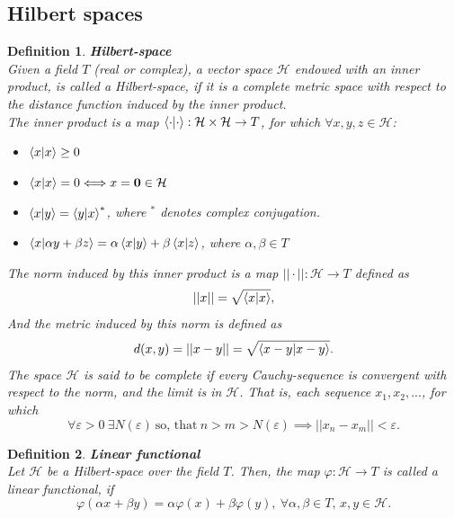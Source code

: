 \documentclass[12pt, a4paper,  nobibnotes]{article}
\newcommand{\bb}[1]{\mathbf{#1}}
\newtheorem{definition}{Definition}
\begin{document}
\subsection{Hilbert spaces}
\label{appendix:Hilbertspace}
\begin{definition}
    \textbf{Hilbert-space}\\
    Given a field $T$ (real or complex), a vector space $\mathcal H$ endowed with an inner product, is called a Hilbert-space, if
    it is a complete metric space with respect to the distance function induced by the inner product.
    \\
    The inner product is a map $\braket{\cdot|\cdot}:\mathcal{H}\times\mathcal{H} \rightarrow T$, 
    for which $\forall x,y,z \in \mathcal H$:
    \begin{itemize}
        \item $\braket{x|x} \geq 0$
        \item $\braket{x|x} = 0 \Longleftrightarrow x = \bb 0 \in \mathcal H$
        \item $\braket{x|y} = \braket{y|x}^*$, where $^*$ denotes complex conjugation.
        \item $\braket{x|\alpha y + \beta z} = \alpha\braket{x|y} + \beta\braket{x|z}$, where $\alpha, \beta \in T$
    \end{itemize}
    The norm induced by this inner product is a map $||\cdot||:\mathcal H \rightarrow T$ defined as
    \begin{equation*}
        ||x||=\sqrt{\braket{x|x}},
    \end{equation*}
    And the metric induced by this norm is defined as
    \begin{equation*}
        d(x,y) = ||x - y|| = \sqrt{\braket{x - y|x - y}}.
    \end{equation*}
    The space $\mathcal H$ is said to be complete if every Cauchy-sequence is convergent with respect to the norm, and
    the limit is in $\mathcal H$. That is, each sequence ${x_1, x_2, ... }$, for which 
    \begin{equation*}
        \forall \varepsilon > 0 ~ \exists N(\varepsilon) ~\textrm{so, that}~ n>m>N(\varepsilon) \implies ||x_n - x_m||<\varepsilon.
    \end{equation*}
\end{definition} 

\begin{definition}
    \textbf{Linear functional}\\
    Let $\mathcal H$ be a Hilbert-space over the field $T$. Then, the map $\varphi:\mathcal H \rightarrow T$ is  
    called a linear functional, if
    \begin{equation*}
        \varphi(\alpha x + \beta y) = \alpha \varphi(x) + \beta \varphi(y),~
        \forall \alpha, \beta \in T,\, x, y \in \mathcal H.
    \end{equation*}
\end{definition}
\end{document}
